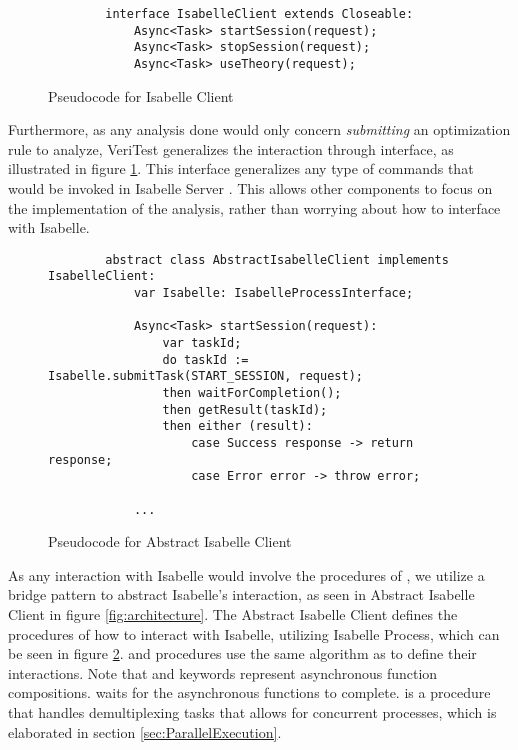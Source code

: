 \begin{figure}[h]
    \begin{lstlisting}
        interface IsabelleClient extends Closeable:
            Async<Task> startSession(request);
            Async<Task> stopSession(request);
            Async<Task> useTheory(request);
    \end{lstlisting}

    \caption{Pseudocode for Isabelle Client}
    \label{fig:IsabelleClientInterface}
\end{figure}

Furthermore, as any analysis done would only concern \emph{submitting} an optimization rule to analyze, VeriTest generalizes the interaction 
through  interface, as illustrated in figure \ref{fig:IsabelleClientInterface}. This interface generalizes any type of 
commands that would be invoked in Isabelle Server \cite[Sec. 4.4]{isabelleSystem}. This allows other components to focus on the implementation 
of the analysis, rather than worrying about how to interface with Isabelle.

\begin{figure}[h]
    \begin{lstlisting}
        abstract class AbstractIsabelleClient implements IsabelleClient:
            var Isabelle: IsabelleProcessInterface;
        
            Async<Task> startSession(request):
                var taskId;
                do taskId := Isabelle.submitTask(START_SESSION, request);
                then waitForCompletion();
                then getResult(taskId);
                then either (result):
                    case Success response -> return response;
                    case Error error -> throw error;
            
            ...
    \end{lstlisting}

    \caption{Pseudocode for Abstract Isabelle Client}
    \label{fig:AbstractIsabelleClient}
\end{figure}

As any interaction with Isabelle would involve the procedures of , we utilize a bridge pattern to abstract Isabelle's 
interaction, as seen in Abstract Isabelle Client in figure \ref{fig:architecture}. The Abstract Isabelle Client defines the procedures of 
how to interact with Isabelle, utilizing Isabelle Process, which can be seen in figure \ref{fig:AbstractIsabelleClient}. 
 and  procedures use the same algorithm as  to define their interactions.
Note that  and  keywords represent asynchronous function compositions.  waits for the 
asynchronous functions to complete.  is a procedure that handles demultiplexing tasks that allows for concurrent 
processes, which is elaborated in section \ref{sec:ParallelExecution}.

